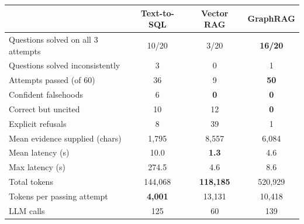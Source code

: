 \begin{tabular}{@{}lccc@{}}
\toprule
& \textbf{Text-to-SQL} & \textbf{Vector RAG} & \textbf{GraphRAG} \\
\midrule
Questions solved on all 3 attempts & 10/20 & 3/20 & \textbf{16/20} \\
Questions solved inconsistently & 3 & 0 & 1 \\
Attempts passed (of 60) & 36 & 9 & \textbf{50} \\
\midrule
Confident falsehoods & \textcolor{badcol}{6} & \textbf{0} & \textbf{0} \\
Correct but uncited & 10 & 12 & \textbf{0} \\
Explicit refusals & 8 & 39 & 1 \\
\midrule
Mean evidence supplied (chars) & 1,795 & 8,557 & 6,084 \\
Mean latency (s) & 10.0 & \textbf{1.3} & 4.6 \\
Max latency (s) & 274.5 & 4.6 & 8.6 \\
Total tokens & 144,068 & \textbf{118,185} & 520,929 \\
Tokens per passing attempt & \textbf{4,001} & 13,131 & 10,418 \\
LLM calls & 125 & 60 & 139 \\
\bottomrule
\end{tabular}
